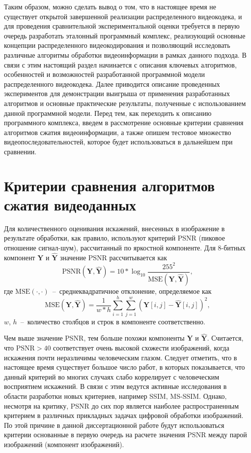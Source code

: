 Таким образом, можно сделать вывод о том, что в настоящее время не существует открытой завершенной реализации распределенного видеокодека, и для проведения сравнительной экспериментальной оценки требуется в первую очередь разработать эталонный программный комплекс, реализующий основные концепции распределенного видеокодирования и позволяющий исследовать различные алгоритмы обработки видеоинформации в рамках данного подхода. В связи с этим настоящий раздел начинается с описания ключевых алгоритмов, особенностей и возможностей разработанной программной модели распределенного видеокодека. Далее приводится описание проведенных экспериментов для демонстрации выигрыша от применения разработанных алгоритмов и основные практические результаты, полученные с использованием данной программной модели. Перед тем, как переходить к описанию программного комплекса, введем в рассмотрение основные критерии сравнения алгоритмов сжатия видеоинформации, а также опишем тестовое множество видеопоследовательностей, которое будет использоваться в дальнейшем при сравнении.

\section{Критерии сравнения алгоритмов сжатия видеоданных}
\label{chap:ExpResults:Criteria}

Для количественного оценивания искажений, внесенных в изображение в результате обработки, как правило, используют критерий PSNR (пиковое отношение сигнал-шум), рассчитанный по яркостной компоненте. Для 8-битных компонент $\mathbf{Y}$ и $\widehat{\mathbf{Y}}$ значение PSNR рассчитывается как
\begin{equation}
\mathrm{PSNR}(\mathbf{Y},\widehat{\mathbf{Y}}) = 10 * \log_{10} \frac{255^2}{\mathrm{MSE}(\mathbf{Y},\widehat{\mathbf{Y}})},
\end{equation}
где $\mathrm{MSE}(\cdot,\cdot)$~--~среднеквадратичное отклонение, определяемое как
\begin{equation}
\mathrm{MSE}(\mathbf{Y},\widehat{\mathbf{Y}}) = \frac{1}{w*h} \sum\limits_{i=1}^{h}\sum\limits_{j=1}^{w} \left(\mathbf{Y}[i,j]-\widehat{\mathbf{Y}}[i,j]\right)^2,
\end{equation}
$w$, $h$~--~количество столбцов и строк в компоненте соответственно.

Чем выше значение PSNR, тем больше похожи компоненты $\mathbf{Y}$ и $\widehat{\mathbf{Y}}$. Считается, что $\mathrm{PSNR}>40$ соответствует очень высокой схожести изображений, когда искажения почти неразличимы человеческим глазом. Следует отметить, что в настоящее время существует большое число работ, в которых показывается, что данный критерий во многих случаях слабо коррелирует с человеческим восприятием искажений. В связи с этим ведутся активные исследования в области разработки новых критериев, например SSIM, MS-SSIM. Однако, несмотря на критику, PSNR до сих пор является наиболее распространенным критерием в различных прикладных задачах цифровой обработки изображений. По этой причине в данной диссертационной работе будут использоваться критерии основанные в первую очередь на расчете значения PSNR между парой изображений (компонент изображений).

